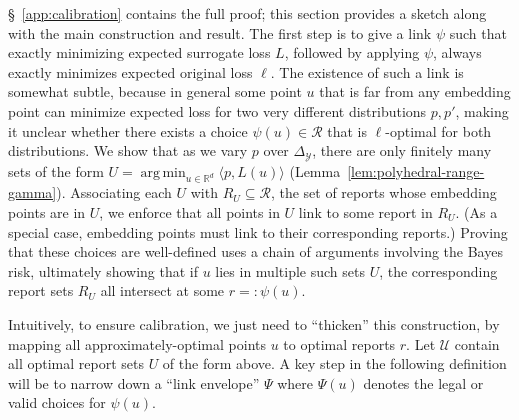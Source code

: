 \documentclass[11pt]{article}
\newcommand{\Comments}{1}
\newcommand{\mynote}[2]{\ifnum\Comments=1\textcolor{#1}{#2}\fi}
\newcommand{\bo}[1]{\mynote{blue}{[Bo: #1]}}
\newcommand{\reals}{\mathbb{R}}
\newcommand{\simplex}{\Delta_\Y}
\newcommand{\R}{\mathcal{R}}
\newcommand{\U}{\mathcal{U}}
\newcommand{\Y}{\mathcal{Y}}
\newcommand{\inprod}[2]{\langle #1, #2 \rangle}%
\newcommand{\toto}{\rightrightarrows}
\newcommand{\trim}{\mathrm{trim}}
\DeclareMathOperator*{\argmin}{arg\,min}
\newtheorem{proposition}{Proposition}
\begin{document}
\S~\ref{app:calibration} contains the full proof; this section provides a sketch along with the main construction and result.
The first step is to give a link $\psi$ such that exactly minimizing expected surrogate loss $L$, followed by applying $\psi$, always exactly minimizes expected original loss $\ell$.
The existence of such a link is somewhat subtle, because in general some point $u$ that is far from any embedding point can minimize expected loss for two very different distributions $p,p'$, making it unclear whether there exists a choice $\psi(u)\in\R$ that is $\ell$-optimal for both distributions.
We show that as we vary $p$ over $\simplex$, there are only finitely many sets of the form $U = \argmin_{u \in \reals^d} \inprod{p}{L(u)}$ (Lemma~\ref{lem:polyhedral-range-gamma}).
Associating each $U$ with $R_U \subseteq \R$, the set of reports whose embedding points are in $U$, we enforce that all points in $U$ link to some report in $R_U$.
(As a special case, embedding points must link to their corresponding reports.)
Proving that these choices are well-defined uses a chain of arguments involving the Bayes risk, ultimately showing that if $u$ lies in multiple such sets $U$, the corresponding report sets $R_U$ all intersect at some $r =: \psi(u)$.

%

Intuitively, to ensure calibration, we just need to ``thicken'' this construction, by mapping all approximately-optimal points $u$ to optimal reports $r$.
Let $\U$ contain all optimal report sets $U$ of the form above.
A key step in the following definition will be to narrow down a ``link envelope'' $\Psi$ where $\Psi(u)$ denotes the legal or valid choices for $\psi(u)$.
\end{document}
